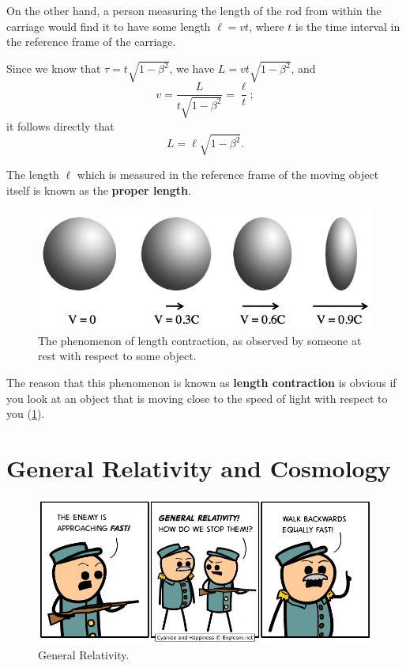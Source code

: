 \documentclass[a4paper]{amsbook}
\theoremstyle{definition}
\numberwithin{exercise}{chapter}
\numberwithin{exercise}{chapter}
\newcommand\capcite[1]{}
\begin{document}
On the other hand, a person measuring the length of the rod from within the carriage would find it to have some length $ \ell = vt $,
where $ t $ is the time interval in the reference frame of the carriage.

Since we know that $ \tau = t\sqrt{1 - \beta^2} $, we have $ L = vt\sqrt{1 - \beta^2} $, and
\begin{displaymath}
  v = \frac{L}{t\sqrt{1 - \beta^2}} = \frac{\ell}{t};
\end{displaymath}
it follows directly that
\begin{equation}
  L = \ell \sqrt{1 - \beta^2}.
\end{equation}

The length $ \ell $ which is measured in the reference frame of the moving object itself is known as the \textbf{proper length}.

\begin{figure}
  \centering
  \includegraphics[width=\textwidth]{lengthcontraction}
  \caption{The phenomenon of length contraction, as observed by someone at rest with respect to some object. \capcite{http://www.askamathematician.com/wp-content/uploads/2011/01/tallball.jpg} \label{fig:lengthcontraction}}
\end{figure}

The reason that this phenomenon is known as \textbf{length contraction} is obvious if you look at an object that is moving close to the speed
of light with respect to you (\cref{fig:lengthcontraction}).

\section{General Relativity and Cosmology}
\begin{figure}
  \centering
  \includegraphics[width=\textwidth]{relativity2}
  \caption{General Relativity. \capcite{http://files.explosm.net/comics/Rob/enemyadvancing.png?t=A67DDE} \label{fig:relativity2}}
\end{figure}
\end{document}
